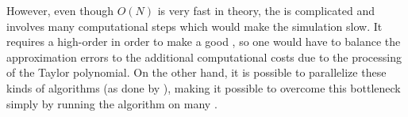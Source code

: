 However, even though $O(N)$ is very fast in theory, the \CFMM is complicated and involves many computational steps which would make the simulation slow. It requires a high-order  in order to make a good \approximation, so one would have to balance the approximation errors to the additional computational costs due to the processing of the Taylor polynomial. On the other hand, it is possible to parallelize these kinds of algorithms (as done by \citet{Board1994}), making it possible to overcome this bottleneck simply by running the algorithm on many .
